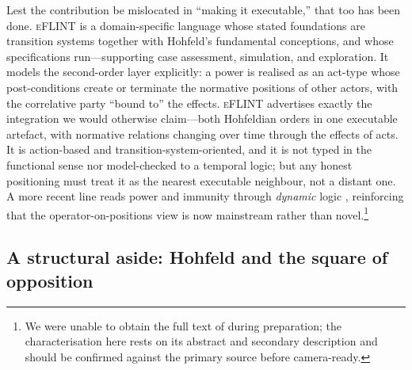 Lest the contribution be mislocated in ``making it executable,'' that too has
been done. \textsc{eFLINT}  is a domain-specific
language whose stated foundations are transition systems together with Hohfeld's
fundamental conceptions, and whose specifications run---supporting case
assessment, simulation, and exploration. It models the second-order layer
explicitly: a power is realised as an act-type whose post-conditions create or
terminate the normative positions of other actors, with the correlative party
``bound to'' the effects. \textsc{eFLINT} advertises exactly the integration we
would otherwise claim---both Hohfeldian orders in one executable artefact, with
normative relations changing over time through the effects of acts. It is
action-based and transition-system-oriented, and it is not typed in the
functional sense nor model-checked to a temporal logic; but any honest positioning
must treat it as the nearest executable neighbour, not a distant one. A more
recent line reads power and immunity through \emph{dynamic} logic
, reinforcing that the operator-on-positions view is now
mainstream rather than novel.\footnote{We were unable to obtain the full text of
 during preparation; the characterisation here rests on its
abstract and secondary description and should be confirmed against the primary
source before camera-ready.}

\subsection{A structural aside: Hohfeld and the square of opposition}
\label{sec:square-of-opposition}

